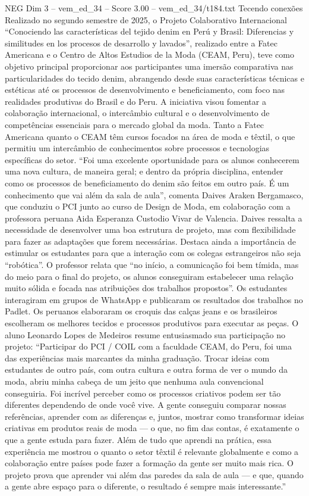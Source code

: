 \begin{textsample}{NEG Dim 3 – vem\_ed\_34 – Score 3.00 – vem\_ed\_34/t184.txt}  \label{ex:f3_neg_123}
Tecendo conexões Realizado no segundo semestre de 2025, o Projeto Colaborativo Internacional “Conociendo las características del tejido denim en Perú y Brasil: Diferencias y similitudes en los procesos de desarrollo y lavados”, realizado entre a Fatec Americana e o Centro de Altos Estudios de la Moda (CEAM, Peru), teve como objetivo principal proporcionar aos participantes uma imersão comparativa nas particularidades do tecido denim, abrangendo desde suas características técnicas e estéticas até os processos de desenvolvimento e beneficiamento, com foco nas realidades produtivas do Brasil e do Peru.
A iniciativa visou fomentar a colaboração internacional, o intercâmbio cultural e o desenvolvimento de competências essenciais para o mercado global da moda.
Tanto a Fatec Americana quanto o CEAM têm cursos focados na área de moda e têxtil, o que permitiu um intercâmbio de conhecimentos sobre processos e tecnologias específicas do setor. “Foi uma excelente oportunidade para os alunos conhecerem uma nova cultura, de maneira geral; e dentro da própria disciplina, entender como os processos de beneficiamento do denim são feitos em outro país.
É um conhecimento que vai além da sala de aula”, comenta Daives Araken Bergamasco, que conduziu o PCI junto ao curso de Design de Moda, em colaboração com a professora peruana Aida Esperanza Custodio Vivar de Valencia.
Daives ressalta a necessidade de desenvolver uma boa estrutura de projeto, mas com flexibilidade para fazer as adaptações que forem necessárias.
Destaca ainda a importância de estimular os estudantes para que a interação com os colegas estrangeiros não seja “robótica”.
O professor relata que “no início, a comunicação foi bem tímida, mas do meio para o final do projeto, os alunos conseguiram estabelecer uma relação muito sólida e focada nas atribuições dos trabalhos propostos”.
Os estudantes interagiram em grupos de WhatsApp e publicaram os resultados dos trabalhos no Padlet.
Os peruanos elaboraram os croquis das calças jeans e os brasileiros escolheram os melhores tecidos e processos produtivos para executar as peças.
O aluno Leonardo Lopes de Medeiros resume entusiasmado sua participação no projeto: “Participar do PCI / COIL com a faculdade CEAM, do Peru, foi uma das experiências mais marcantes da minha graduação.
Trocar ideias com estudantes de outro país, com outra cultura e outra forma de ver o mundo da moda, abriu minha cabeça de um jeito que nenhuma aula convencional conseguiria.
Foi incrível perceber como os processos criativos podem ser tão diferentes dependendo de onde você vive.
A gente conseguiu comparar nossas referências, aprender com as diferenças e, juntos, mostrar como transformar ideias criativas em produtos reais de moda — o que, no fim das contas, é exatamente o que a gente estuda para fazer.
Além de tudo que aprendi na prática, essa experiência me mostrou o quanto o setor têxtil é relevante globalmente e como a colaboração entre países pode fazer a formação da gente ser muito mais rica.
O projeto prova que aprender vai além das paredes da sala de aula — e que, quando a gente abre espaço para o diferente, o resultado é sempre mais interessante.”

\end{textsample}

